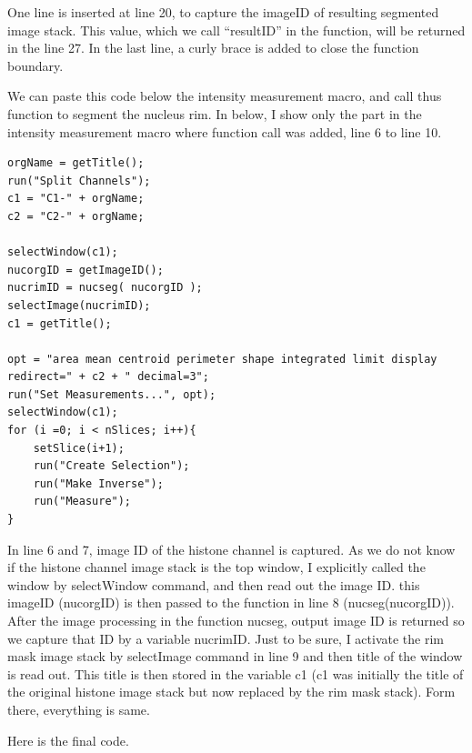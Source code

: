 One line is inserted at line 20, to capture the imageID of resulting segmented image stack. This value, which we call ``resultID'' in the function, will be returned in the line 27. In the last line, a curly brace is added to close the function boundary. 

We can paste this code below the intensity measurement macro, and call thus function to segment the nucleus rim. In below, I show only the part in the intensity measurement macro where function call was added, line 6 to line 10. 

\begin{lstlisting}
orgName = getTitle();
run("Split Channels");
c1 = "C1-" + orgName;
c2 = "C2-" + orgName;

selectWindow(c1);
nucorgID = getImageID();
nucrimID = nucseg( nucorgID );
selectImage(nucrimID);
c1 = getTitle();

opt = "area mean centroid perimeter shape integrated limit display redirect=" + c2 + " decimal=3";
run("Set Measurements...", opt);
selectWindow(c1);
for (i =0; i < nSlices; i++){
	setSlice(i+1);
	run("Create Selection");
	run("Make Inverse");
	run("Measure");
}
\end{lstlisting}

In line 6 and 7, image ID of the histone channel is captured. As we do not know if the histone channel image stack is the top window, I explicitly called the window by selectWindow command, and then read out the image ID. this imageID (nucorgID) is then passed to the function in line 8 (nucseg(nucorgID)). After the image processing in the function nucseg, output image ID is returned so we capture that ID by a variable nucrimID. Just to be sure, I activate the rim mask image stack by selectImage command in line 9 and then title of the window is read out. This title is then stored in the variable c1 (c1 was initially the title of the original histone image stack but now replaced by the rim mask stack). Form there, everything is same. 

Here is the final code. 

 